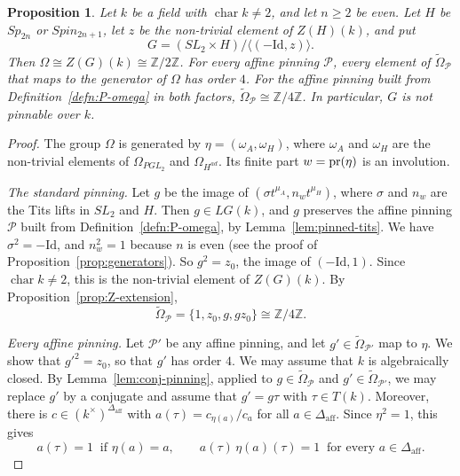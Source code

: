 \documentclass[psamsfonts]{amsart}
\newtheorem{prop}[thm]{Proposition}
\theoremstyle{definition}
\theoremstyle{remark}
\numberwithin{equation}{section}
\newcommand{\Z}{\mathbb{Z}}   %
\newcommand{\tOm}{\widetilde{\Omega}}
\DeclareMathOperator{\aff}{aff}
\DeclareMathOperator{\chara}{char}
\newcommand\cP{\mathcal{P}}
\numberwithin{equation}{section}
\newcommand{\om}{\omega}
\newcommand{\Om}{\Omega}
\newcommand\pr{\textup{pr}}
\newcommand{\Id}{\mathrm{Id}}
\newcommand{\Daff}{\Delta_{\aff}}
\theoremstyle{plain}
\begin{document}
\begin{prop}\label{prop:B2-body}
Let $k$ be a field with $\chara k\neq2$, and let $n\geq2$ be even. Let $H$ be $Sp_{2n}$ or $Spin_{2n+1}$, let $z$ be the non-trivial element of $Z(H)(k)$, and put
\[
G=(SL_2\times H)/\langle(-\Id,z)\rangle.
\]
Then $\Om\cong Z(G)(k)\cong\Z/2\Z$. For every affine pinning $\cP$, every element of $\tOm_{\cP}$ that maps to the generator of $\Om$ has order $4$. For the affine pinning built from Definition~\ref{defn:P-omega} in both factors, $\tOm_{\cP}\cong\Z/4\Z$. In particular, $G$ is not pinnable over $k$.
\end{prop}

\begin{proof}
The group $\Om$ is generated by $\eta=(\om_A,\om_H)$, where $\om_A$ and $\om_H$ are the non-trivial elements of $\Om_{PGL_2}$ and $\Om_{H^{ad}}$. Its finite part $w=\pr(\eta)$ is an involution.

\emph{The standard pinning.} Let $g$ be the image of $(\sigma t^{\mu_A},n_wt^{\mu_H})$, where $\sigma$ and $n_w$ are the Tits lifts in $SL_2$ and $H$. Then $g\in LG(k)$, and $g$ preserves the affine pinning $\cP$ built from Definition~\ref{defn:P-omega}, by Lemma~\ref{lem:pinned-tits}. We have $\sigma^2=-\Id$, and $n_w^2=1$ because $n$ is even (see the proof of Proposition~\ref{prop:generators}). So $g^2=z_0$, the image of $(-\Id,1)$. Since $\chara k\neq2$, this is the non-trivial element of $Z(G)(k)$. By Proposition~\ref{prop:Z-extension},
\[
\tOm_{\cP}=\{1,z_0,g,gz_0\}\cong\Z/4\Z.
\]

\emph{Every affine pinning.} Let $\cP'$ be any affine pinning, and let $g'\in\tOm_{\cP'}$ map to $\eta$. We show that $g'^2=z_0$, so that $g'$ has order $4$. We may assume that $k$ is algebraically closed. By Lemma~\ref{lem:conj-pinning}, applied to $g\in\tOm_\cP$ and $g'\in\tOm_{\cP'}$, we may replace $g'$ by a conjugate and assume that $g'=g\tau$ with $\tau\in T(k)$. Moreover, there is $c\in(k^\times)^{\Daff}$ with $a(\tau)=c_{\eta(a)}/c_a$ for all $a\in\Daff$. Since $\eta^2=1$, this gives
\[
a(\tau)=1\ \text{ if }\eta(a)=a,\qquad a(\tau)\,\eta(a)(\tau)=1\ \text{ for every }a\in\Daff.\tag{$*$}
\]


\end{proof}
\end{document}
